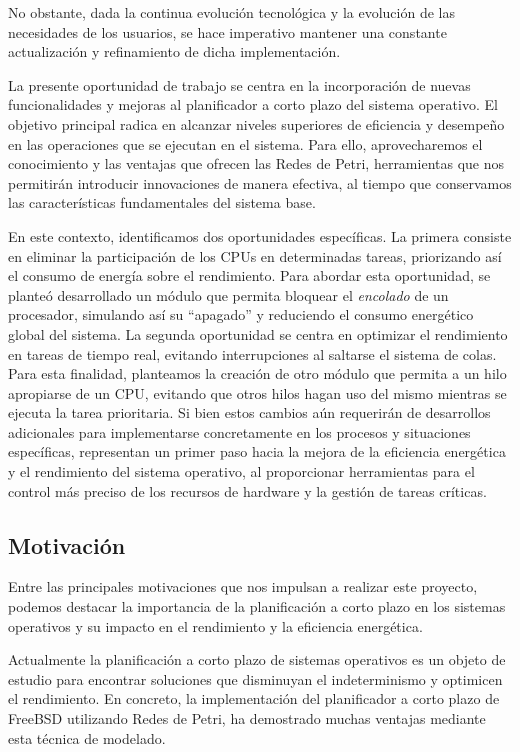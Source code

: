 No obstante, dada la continua evolución tecnológica y la evolución de las necesidades de los usuarios, se hace imperativo mantener una constante actualización y refinamiento de dicha implementación.\par

La presente oportunidad de trabajo se centra en la incorporación de nuevas funcionalidades y mejoras al planificador a corto plazo del sistema operativo. El objetivo principal radica en alcanzar niveles superiores de eficiencia y desempeño en las operaciones que se ejecutan en el sistema. Para ello, aprovecharemos el conocimiento y las ventajas que ofrecen las Redes de Petri, herramientas que nos permitirán introducir innovaciones de manera efectiva, al tiempo que conservamos las características fundamentales del sistema base.\par

En este contexto, identificamos dos oportunidades específicas. La primera consiste en eliminar la participación de los CPUs en determinadas tareas, priorizando así el consumo de energía sobre el rendimiento. Para abordar esta oportunidad, se planteó desarrollado un módulo que permita bloquear el \textit{encolado} de un procesador, simulando así su ``apagado'' y reduciendo el consumo energético global del sistema. La segunda oportunidad se centra en optimizar el rendimiento en tareas de tiempo real, evitando interrupciones al saltarse el sistema de colas. Para esta finalidad, planteamos la creación de otro módulo que permita a un hilo apropiarse de un CPU, evitando que otros hilos hagan uso del mismo mientras se ejecuta la tarea prioritaria. Si bien estos cambios aún requerirán de desarrollos adicionales para implementarse concretamente en los procesos y situaciones específicas, representan un primer paso hacia la mejora de la eficiencia energética y el rendimiento del sistema operativo, al proporcionar herramientas para el control más preciso de los recursos de hardware y la gestión de tareas críticas.\par

\subsection{Motivación}
Entre las principales motivaciones que nos impulsan a realizar este proyecto, podemos destacar la importancia de la planificación a corto plazo en los sistemas operativos y su impacto en el rendimiento y la eficiencia energética.

Actualmente la planificación a corto plazo de sistemas operativos es un objeto de estudio para encontrar soluciones que disminuyan el indeterminismo y optimicen el rendimiento. En concreto, la implementación del planificador a corto plazo de FreeBSD utilizando Redes de Petri, ha demostrado muchas ventajas mediante esta técnica de modelado.\par

